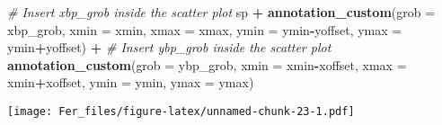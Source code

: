 \documentclass[
]{article}
\newenvironment{Shaded}{\begin{snugshade}}{\end{snugshade}}
\newcommand{\AttributeTok}[1]{\textcolor[rgb]{0.13,0.29,0.53}{#1}}
\newcommand{\CommentTok}[1]{\textcolor[rgb]{0.56,0.35,0.01}{\textit{#1}}}
\newcommand{\FunctionTok}[1]{\textcolor[rgb]{0.13,0.29,0.53}{\textbf{#1}}}
\newcommand{\NormalTok}[1]{#1}
\newcommand{\SpecialCharTok}[1]{\textcolor[rgb]{0.81,0.36,0.00}{\textbf{#1}}}
\begin{document}
\begin{Shaded}
\begin{Highlighting}[]
\CommentTok{\# Insert xbp\_grob inside the scatter plot}
\NormalTok{sp }\SpecialCharTok{+} \FunctionTok{annotation\_custom}\NormalTok{(}\AttributeTok{grob =}\NormalTok{ xbp\_grob, }\AttributeTok{xmin =}\NormalTok{ xmin, }\AttributeTok{xmax =}\NormalTok{ xmax, }
                       \AttributeTok{ymin =}\NormalTok{ ymin}\SpecialCharTok{{-}}\NormalTok{yoffset, }\AttributeTok{ymax =}\NormalTok{ ymin}\SpecialCharTok{+}\NormalTok{yoffset) }\SpecialCharTok{+}
  \CommentTok{\# Insert ybp\_grob inside the scatter plot}
  \FunctionTok{annotation\_custom}\NormalTok{(}\AttributeTok{grob =}\NormalTok{ ybp\_grob,}
                    \AttributeTok{xmin =}\NormalTok{ xmin}\SpecialCharTok{{-}}\NormalTok{xoffset, }\AttributeTok{xmax =}\NormalTok{ xmin}\SpecialCharTok{+}\NormalTok{xoffset, }
                    \AttributeTok{ymin =}\NormalTok{ ymin, }\AttributeTok{ymax =}\NormalTok{ ymax)}
\end{Highlighting}
\end{Shaded}

\texttt{[image: Fer\_files/figure-latex/unnamed-chunk-23-1.pdf]}
\end{document}
